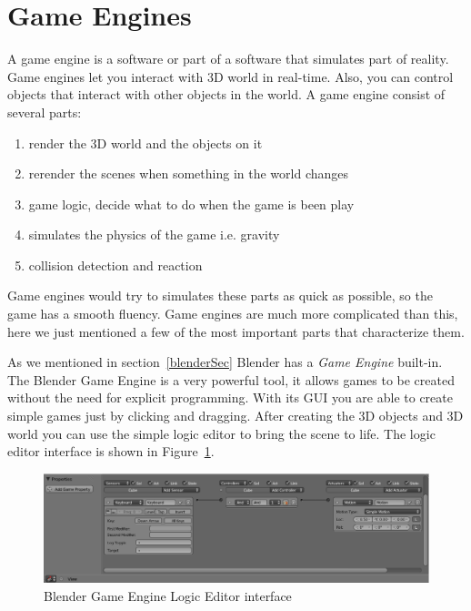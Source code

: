 \section{Game Engines}

A game engine is a software or part of a software that simulates part of reality\cite{bookGameKit2}. Game engines let you interact with 3D world in real-time. Also, you can control objects that interact with other objects in the world. A game engine consist of several parts:
\begin{enumerate}
\item{render the 3D world and the objects on it}
\item{rerender the scenes when something in the world changes}
\item{game logic, decide what to do when the game is been play}
\item{simulates the physics of the game i.e. gravity}
\item{collision detection and reaction}
\end{enumerate}

Game engines would try to simulates these parts as quick as possible, so the game has a smooth fluency. Game engines are much more complicated than this, here we just mentioned a few of the most important parts that characterize them.

As we mentioned in section~\ref{blenderSec} Blender has a \textit{Game Engine} built-in. The Blender Game Engine is a very powerful tool, it allows games to be created without  the need for explicit programming. With its GUI you are able to create simple games just by clicking and dragging. After creating the 3D objects and 3D world you can use the simple logic editor to bring the scene to life. The logic editor interface is shown in Figure~\ref{logic}.

\begin{figure}[htbp]
\begin{center}
\includegraphics[scale=0.4]{figures/logic.eps}
\caption{Blender Game Engine Logic Editor interface}
\label{logic}
\end{center}
\end{figure}

